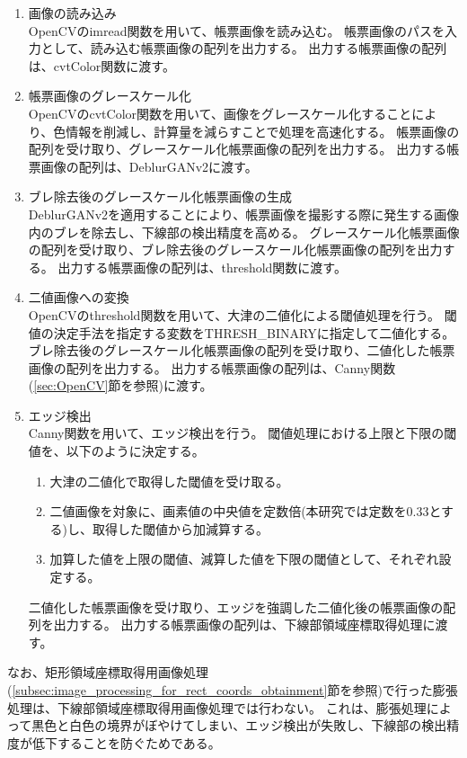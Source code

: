 \begin{enumerate}
    \item 画像の読み込み\\
        OpenCVのimread関数を用いて、帳票画像を読み込む。
        帳票画像のパスを入力として、読み込む帳票画像の配列を出力する。
        出力する帳票画像の配列は、cvtColor関数に渡す。
    \item 帳票画像のグレースケール化\\
        OpenCVのcvtColor関数を用いて、画像をグレースケール化することにより、色情報を削減し、計算量を減らすことで処理を高速化する。
        帳票画像の配列を受け取り、グレースケール化帳票画像の配列を出力する。
        出力する帳票画像の配列は、DeblurGANv2に渡す。
    \item ブレ除去後のグレースケール化帳票画像の生成\\
        DeblurGANv2を適用することにより、帳票画像を撮影する際に発生する画像内のブレを除去し、下線部の検出精度を高める。
        グレースケール化帳票画像の配列を受け取り、ブレ除去後のグレースケール化帳票画像の配列を出力する。
        出力する帳票画像の配列は、threshold関数に渡す。
    \item 二値画像への変換\\
        OpenCVのthreshold関数を用いて、大津の二値化による閾値処理を行う。
        閾値の決定手法を指定する変数をTHRESH\_BINARYに指定して二値化する。
        ブレ除去後のグレースケール化帳票画像の配列を受け取り、二値化した帳票画像の配列を出力する。
        出力する帳票画像の配列は、Canny関数(\ref{sec:OpenCV}節を参照)に渡す。
    \item エッジ検出\\
        Canny関数を用いて、エッジ検出を行う。
        閾値処理における上限と下限の閾値を、以下のように決定する。
        \begin{enumerate}
            \item 大津の二値化で取得した閾値を受け取る。
            \item 二値画像を対象に、画素値の中央値を定数倍(本研究では定数を0.33とする)し、取得した閾値から加減算する。
            \item 加算した値を上限の閾値、減算した値を下限の閾値として、それぞれ設定する。
        \end{enumerate}
        二値化した帳票画像を受け取り、エッジを強調した二値化後の帳票画像の配列を出力する。
        出力する帳票画像の配列は、下線部領域座標取得処理に渡す。
\end{enumerate}

なお、矩形領域座標取得用画像処理(\ref{subsec:image_processing_for_rect_coords_obtainment}節を参照)で行った膨張処理は、下線部領域座標取得用画像処理では行わない。
これは、膨張処理によって黒色と白色の境界がぼやけてしまい、エッジ検出が失敗し、下線部の検出精度が低下することを防ぐためである。

